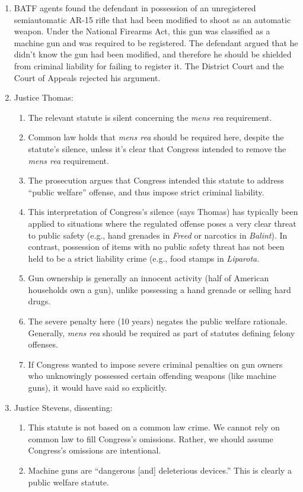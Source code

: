 \begin{enumerate}
    \item BATF agents found the defendant in possession of an unregistered semiautomatic AR-15 rifle that had been modified to shoot as an automatic weapon. Under the National Firearms Act, this gun was classified as a machine gun and was required to be registered. The defendant argued that he didn't know the gun had been modified, and therefore he should be shielded from criminal liability for failing to register it. The District Court and the Court of Appeals rejected his argument.
    \item Justice Thomas:
    \begin{enumerate}
        \item The relevant statute is silent concerning the \emph{mens rea} requirement.
        \item Common law holds that \emph{mens rea} should be required here, despite the statute's silence, unless it's clear that Congress intended to remove the \emph{mens rea} requirement.
        \item The prosecution argues that Congress intended this statute to address ``public welfare'' offense, and thus impose strict criminal liability.
        \item This interpretation of Congress's silence (says Thomas) has typically been applied to situations where the regulated offense poses a very clear threat to public safety (e.g., hand grenades in \emph{Freed} or narcotics in \emph{Balint}). In contrast, possession of items with no public safety threat has not been held to be a strict liability crime (e.g., food stamps in \emph{Liparota}.
        \item Gun ownership is generally an innocent activity (half of American households own a gun), unlike possessing a hand grenade or selling hard drugs.
        \item The severe penalty here (10 years) negates the public welfare rationale. Generally, \emph{mens rea} should be required as part of statutes defining felony offenses.
        \item If Congress wanted to impose severe criminal penalties on gun owners who unknowingly possessed certain offending weapons (like machine guns), it would have said so explicitly.
    \end{enumerate}
    \item Justice Stevens, dissenting:
    \begin{enumerate}
        \item This statute is not based on a common law crime. We cannot rely on common law to fill Congress's omissions. Rather, we should assume Congress's omissions are intentional.
        \item Machine guns are ``dangerous [and] deleterious devices.'' This is clearly a public welfare statute.
    \end{enumerate}
\end{enumerate}

